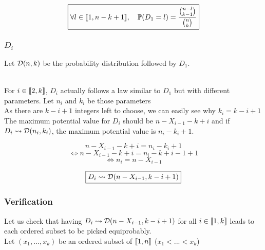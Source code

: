 		\[\boxed{\forall l\in\llbracket1, n - k + 1\rrbracket, \quad \mathbb{P}(D_1 = l) = \frac{\binom{n - l}{k - 1}}{\binom{n}{k}}}\]
		
	\subsubsection{$D_i$}
		Let $\mathcal{D}(n, k)$ be the probability distribution followed by $D_1$.\\\
		
		For $i\in\llbracket2, k\rrbracket$, $D_i$ actually follows a law similar to $D_1$ but with different parameters. Let $n_i$ and $k_i$ be those parameters\\
		As there are $k - i + 1$ integers left to choose, we can easily see why $k_i = k - i + 1$\\
		The maximum potential value for $D_i$ should be $n - X_{i - 1} - k + i$ and if $D_i\leadsto\mathcal{D}(n_i, k_i)$, the maximum potential value is $n_i - k_i + 1$.
		
		\[n - X_{i - 1} - k + i = n_i - k_i + 1\]
		\[\Leftrightarrow n - X_{i - 1} - k + i = n_i - k + i - 1 + 1\]
		\[\Leftrightarrow n_i = n - X_{i - 1}\]
		
		\[\boxed{D_i\leadsto\mathcal{D}(n - X_{i - 1}, k - i + 1)}\]
	
		
	\subsubsection{Verification}
		Let us check that having $D_i\leadsto\mathcal{D}(n - X_{i - 1}, k - i + 1)$ for all $i\in\llbracket1, k\rrbracket$ leads to each ordered subset to be picked equiprobably.\\
		
		Let $(x_1, ..., x_k)$ be an ordered subset of $\llbracket1, n\rrbracket$ ($x_1 < ... < x_k$)
		
